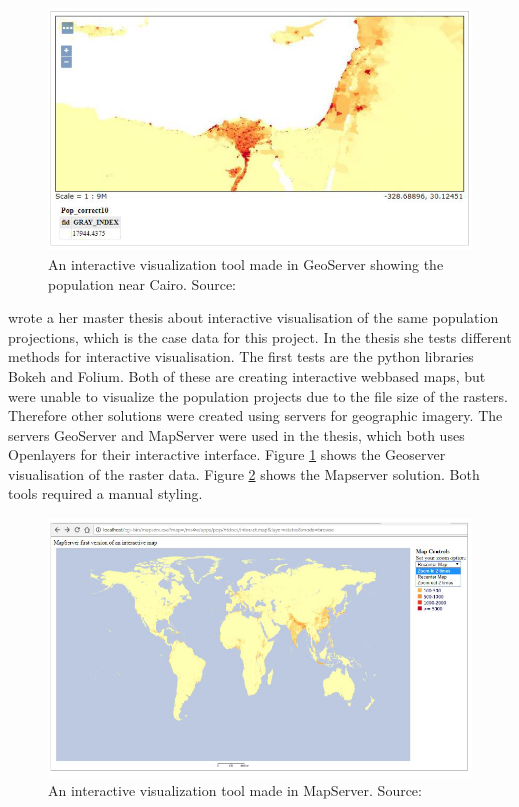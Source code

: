 \begin{figure} [H]
	\centering
	\includegraphics[width=.8\textwidth]{Pictures/Geoserver}
	\caption{An interactive visualization tool made in GeoServer showing the population near Cairo. Source: \citet{Sarah}}
	\label{Geoserver}
\end{figure}

\citet{Sarah} wrote a her master thesis about interactive visualisation of the same population projections, which is the case data for this project. In the thesis she tests different methods for interactive visualisation. The first tests are the python libraries Bokeh and Folium. Both of these are creating interactive webbased maps, but were unable to visualize the population projects due to the file size of the rasters. Therefore other solutions were created using servers for geographic imagery. The servers GeoServer and MapServer were used in the thesis, which both uses Openlayers for their interactive interface. Figure \ref{Geoserver} shows the Geoserver visualisation of the raster data. Figure \ref{Mapserver} shows the Mapserver solution. Both tools required a manual styling.

\begin{figure} [H]
	\centering
	\includegraphics[width=.8\textwidth]{Pictures/Mapserver}
	\caption{An interactive visualization tool made in MapServer. Source: \citet{Sarah}}
	\label{Mapserver}
\end{figure}

